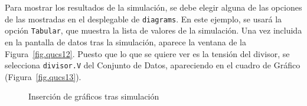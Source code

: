\documentclass[a4paper,10pt]{article} %
\begin{document}
Para mostrar los resultados de la simulación, se debe elegir alguna de las opciones de las mostradas en el desplegable de \texttt{diagrams}. En este ejemplo, se usará la opción \texttt{Tabular}, que muestra la lista de valores de la simulación. Una vez incluida en la pantalla de datos tras la simulación, aparece la ventana de la Figura~\ref{fig.qucs12}. Puesto que lo que se quiere ver es la tensión del divisor, se selecciona \texttt{divisor.V} del Conjunto de Datos, apareciendo en el cuadro de Gráfico (Figura~\ref{fig.qucs13}). 
\begin{figure}[htbp]
    \centering
    \hfill
    \caption{Inserción de gráficos tras simulación}
    \label{fig.ventana}
\end{figure}
\end{document}
